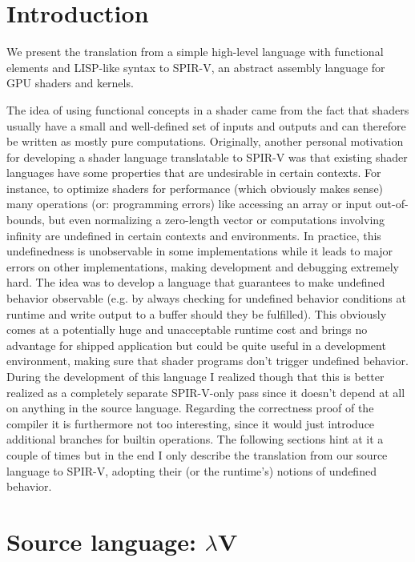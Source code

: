 \documentclass[letterpaper,12pt]{article}
\begin{document}
\section{Introduction}

We present the translation from a simple high-level language with
functional elements and LISP-like syntax to SPIR-V, an abstract
assembly language for GPU shaders and kernels.

The idea of using functional concepts in a shader came from the fact
that shaders usually have a small and well-defined set of inputs
and outputs and can therefore be written as mostly pure computations.
Originally, another personal motivation for developing a shader language
translatable to SPIR-V was that existing shader languages have some properties
that are undesirable in certain contexts. For instance, to optimize
shaders for performance (which obviously makes sense) many operations
(or: programming errors) like accessing an array or input out-of-bounds, but
even normalizing a zero-length vector or computations involving infinity
are undefined in certain contexts and environments. In practice, this
undefinedness is unobservable in some implementations while it leads to
major errors on other implementations, making development and debugging
extremely hard. The idea was to develop a language that guarantees to
make undefined behavior observable (e.g. by always checking for undefined
behavior conditions at runtime and write output to a buffer should
they be fulfilled). This obviously comes at a potentially huge and
unacceptable runtime cost and brings no advantage for shipped application
but could be quite useful in a development environment, making sure
that shader programs don't trigger undefined behavior.
During the development of this language I realized though that this
is better realized as a completely separate SPIR-V-only pass since it
doesn't depend at all on anything in the source language. Regarding
the correctness proof of the compiler it is furthermore not too interesting,
since it would just introduce additional branches for builtin operations.
The following sections hint at it a couple of times but in the end I only describe
the translation from our source language to SPIR-V, adopting their
(or the runtime's) notions of undefined behavior.

\section{Source language: $\lambda$V}
\end{document}
